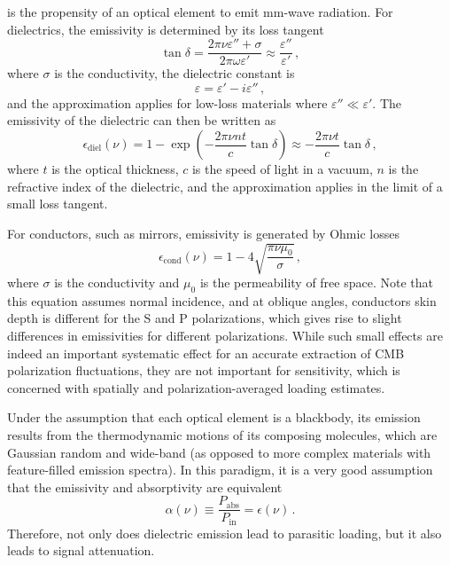  is the propensity of an optical element to emit mm-wave radiation. For dielectrics, the emissivity is determined by its loss tangent
\begin{equation}
    \tan \delta = \frac{2 \pi \nu \varepsilon'' + \sigma}{2 \pi \omega \varepsilon'} \approx \frac{\varepsilon''}{\varepsilon'} \, ,
    \label{eq:loss_tangent}
\end{equation}
where $\sigma$ is the conductivity, the dielectric constant is
\begin{equation}
    \varepsilon = \varepsilon' - i \varepsilon'' \, ,
    \label{eq:dielectric_constant}
\end{equation}
and the approximation applies for low-loss materials where $\varepsilon'' \ll \varepsilon'$. The emissivity of the dielectric can then be written as
\begin{equation}
    \epsilon_{\mathrm{diel}}(\nu) = 1 - \exp \left( - \frac{2 \pi \nu n t}{c} \tan \delta \right) \approx -\frac{2 \pi \nu t}{c} \tan \delta \, ,
    \label{eq:dielectric_emissivity}
\end{equation}
where $t$ is the optical thickness, $c$ is the speed of light in a vacuum, $n$ is the refractive index of the dielectric, and the approximation applies in the limit of a small loss tangent.

For conductors, such as mirrors, emissivity is generated by Ohmic losses
\begin{equation}
    \epsilon_{\mathrm{cond}}(\nu) = 1 - 4 \sqrt{\frac{\pi \nu \mu_{0}}{\sigma}} \, ,
    \label{eq:ohmic_loss_emissivity}
\end{equation}
where $\sigma$ is the conductivity and $\mu_{0}$ is the permeability of free space. Note that this equation assumes normal incidence, and at oblique angles, conductors skin depth is different for the S and P polarizations, which gives rise to slight differences in emissivities for different polarizations. While such small effects are indeed an important systematic effect for an accurate extraction of CMB polarization fluctuations, they are not important for sensitivity, which is concerned with spatially and polarization-averaged loading estimates.

Under the assumption that each optical element is a blackbody, its emission results from the thermodynamic motions of its composing molecules, which are Gaussian random and wide-band (as opposed to more complex materials with feature-filled emission spectra). In this paradigm, it is a very good assumption that the emissivity and absorptivity are equivalent
\begin{equation}
    \alpha(\nu) \equiv \frac{P_{\mathrm{abs}}}{P_{\mathrm{in}}} = \epsilon(\nu) \, .
    \label{eq:emissivity_absorptivity_equivalence}
\end{equation}
Therefore, not only does dielectric emission lead to parasitic loading, but it also leads to signal attenuation.

